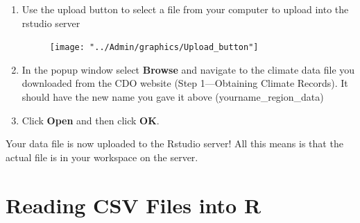\documentclass{article}\usepackage[]{graphicx}\usepackage[]{color}
\begin{document}
  \begin{enumerate}
  \item Use the upload button to select a file from your computer to upload into the rstudio server
  \begin{figure}[h]
  \texttt{[image: "../Admin/graphics/Upload\_button"]}
  \end{figure}
  \item In the popup window select \textbf{Browse} and navigate to the climate data file you downloaded from the CDO website (Step 1---Obtaining Climate Records). It should have the new name you gave it above (yourname\_region\_data)
  \item Click \textbf{Open} and then click \textbf{OK}. 
  
  \end{enumerate}

Your data file is now uploaded to the Rstudio server! All this means is that the actual file is in your workspace on the server. %





\section{Reading CSV Files into R}
\end{document}
